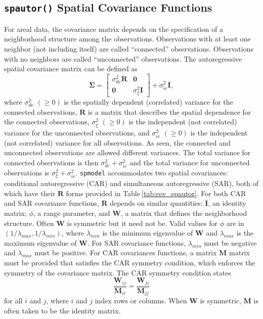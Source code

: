 \documentclass[10pt,letterpaper]{article}
\begin{document}
\hypertarget{spautor-spatial-covariance-functions}{%
\subsection{\texorpdfstring{\texttt{spautor()} Spatial Covariance
Functions}{spautor() Spatial Covariance Functions}}\label{spautor-spatial-covariance-functions}}

For areal data, the covariance matrix depends on the specification of a
neighborhood structure among the observations. Observations with at
least one neighbor (not including itself) are called ``connected''
observations. Observations with no neighbors are called ``unconnected''
observations. The autoregressive spatial covariance matrix can be
defined as \begin{equation*}
  \boldsymbol{\Sigma} =
  \begin{bmatrix}
    \sigma^2_{de} \mathbf{R} & \mathbf{0} \\
    \mathbf{0} & \sigma^2_{\xi} \mathbf{I}
  \end{bmatrix}
  + \sigma^2_{ie} \mathbf{I},
\end{equation*} where \(\sigma^2_{de}\) \((\geq 0)\) is the spatially
dependent (correlated) variance for the connected observations,
\(\mathbf{R}\) is a matrix that describes the spatial dependence for the
connected observations, \(\sigma^2_{\xi}\) \((\geq 0)\) is the
independent (not correlated) variance for the unconnected observations,
and \(\sigma^2_{ie}\) \((\geq 0)\) is the independent (not correlated)
variance for all observations. As seen, the connected and unconnected
observations are allowed different variances. The total variance for
connected observations is then \(\sigma^2_{de} + \sigma^2_{ie}\) and the
total variance for unconnected observations is
\(\sigma^2_{\xi} + \sigma^2_{ie}\). \texttt{spmodel} accommodates two
spatial covariances: conditional autoregressive (CAR) and simultaneous
autoregressive (SAR), both of which have their \(\mathbf{R}\) forms
provided in Table\(~\)\ref{tab:cov_spautor}. For both CAR and SAR
covariance functions, \(\mathbf{R}\) depends on similar quantities:
\(\mathbf{I}\), an identity matrix; \(\phi\), a range parameter, and
\(\mathbf{W}\), a matrix that defines the neighborhood structure. Often
\(\mathbf{W}\) is symmetric but it need not be. Valid values for
\(\phi\) are in \((1 / \lambda_{max}, 1 / \lambda_{min})\), where
\(\lambda_{min}\) is the minimum eigenvalue of \(\mathbf{W}\) and
\(\lambda_{max}\) is the maximum eigenvalue of \(\mathbf{W}\). For SAR
covariance functions, \(\lambda_{min}\) must be negative and
\(\lambda_{max}\) must be positive. For CAR covariances functions, a
matrix \(\mathbf{M}\) matrix must be provided that satisfies the CAR
symmetry condition, which enforces the symmetry of the covariance
matrix. The CAR symmetry condition states \begin{equation*}
  \frac{\mathbf{W}_{ij}}{\mathbf{M}_{ii}} = \frac{\mathbf{W}_{ji}}{\mathbf{M}_{jj}}
\end{equation*} for all \(i\) and \(j\), where \(i\) and \(j\) index
rows or columns. When \(\mathbf{W}\) is symmetric, \(\mathbf{M}\) is
often taken to be the identity matrix.
\end{document}
